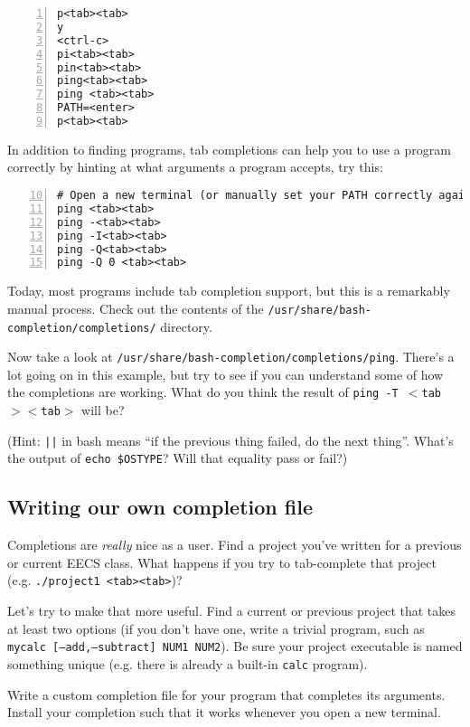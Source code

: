 \documentclass{article}
\begin{document}
\begin{lstlisting}[numbers=left]
p<tab><tab>
y
<ctrl-c>
pi<tab><tab>
pin<tab><tab>
ping<tab><tab>
ping <tab><tab>
PATH=<enter>
p<tab><tab>
\end{lstlisting}

\medskip
\noindent
In addition to finding programs, tab completions can help you to use a program
correctly by hinting at what arguments a program accepts, try this:

\begin{lstlisting}[numbers=left,firstnumber=10]
# Open a new terminal (or manually set your PATH correctly again)
ping <tab><tab>
ping -<tab><tab>
ping -I<tab><tab>
ping -Q<tab><tab>
ping -Q 0 <tab><tab>
\end{lstlisting}

\noindent
Today, most programs include tab completion support, but this is a remarkably
manual process. Check out the contents of the
\texttt{/usr/share/bash-completion/completions/} directory.

\medskip
\noindent
Now take a look at \texttt{/usr/share/bash-completion/completions/ping}.
There's a lot going on in this example, but try to see if you can understand
some of how the completions are working. What do you think the result of
\texttt{ping~-T~$<$tab$><$tab$>$} will be?

\medskip
\noindent
(Hint: \texttt{||} in bash means ``if the previous thing failed, do the next
thing''. What's the output of \texttt{echo \$OSTYPE}? Will that equality pass
or fail?)


\subsection*{Writing our own completion file}

Completions are \emph{really} nice as a user. Find a project you've written
for a previous or current EECS class. What happens if you try to tab-complete
that project (e.g. \texttt{./project1 <tab><tab>})?

\medskip
\noindent
Let's try to make that more useful. Find a current or previous project that
takes at least two options (if you don't have one, write a trivial program,
such as \texttt{mycalc [--add,--subtract] NUM1 NUM2}). Be sure your project
executable is named something unique (e.g. there is already a built-in
\texttt{calc} program).

\medskip
\noindent
Write a custom completion file for your program that completes its arguments.
Install your completion such that it works whenever you open a new terminal.
\end{document}
